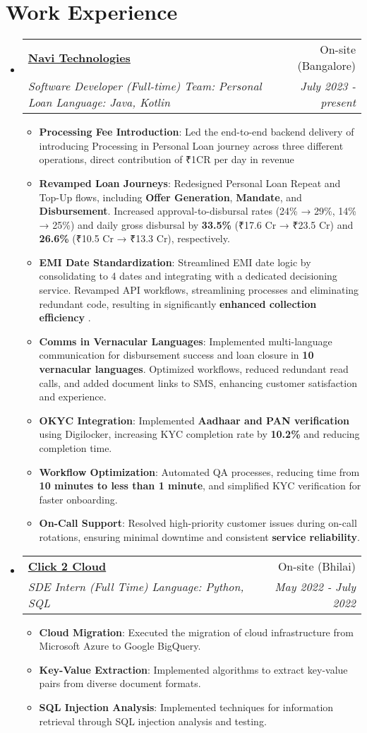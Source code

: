 \documentclass[a4paper,20pt]{article}
\makeatletter
\newcommand{\resumeItem}[2]{
  \item\small{
    \textbf{#1}{: #2 \vspace{-2pt}}
  }
}
\newcommand{\resumeSubheading}[4]{
  \vspace{-1pt}\item
    \begin{tabular*}{0.97\textwidth}{l@{\extracolsep{\fill}}r}
      \textbf{#1} & #2 \\
      \textit{#3} & \textit{#4} \\
    \end{tabular*}\vspace{-5pt}
}
\newcommand{\resumeSubHeadingListStart}{\begin{itemize}[leftmargin=*]}
\newcommand{\resumeSubHeadingListEnd}{\end{itemize}}
\newcommand{\resumeItemListStart}{\begin{itemize}}
\newcommand{\resumeItemListEnd}{\end{itemize}\vspace{-5pt}}
\makeatother
\begin{document}
\section{Work Experience}
  \resumeSubHeadingListStart
    \resumeSubheading{\href{https://navi.com/}{Navi Technologies}}{On-site (Bangalore)}
    {Software Developer (Full-time) \textbar{} Team: Personal Loan \textbar{} Language: Java, Kotlin}
    {July 2023 - present}
    \resumeItemListStart
    \resumeItem {Processing Fee Introduction}{Led the end-to-end backend delivery of introducing Processing in Personal Loan journey across three different operations, direct contribution of ₹1CR per day in revenue}
    \resumeItem {Revamped Loan Journeys}{Redesigned Personal Loan Repeat and Top-Up flows, including \textbf{Offer Generation}, \textbf{Mandate}, and \textbf{Disbursement}. Increased approval-to-disbursal rates (24\% → 29\%, 14\% → 25\%) and daily gross disbursal by \textbf{33.5\%} (₹17.6 Cr → ₹23.5 Cr) and \textbf{26.6\%} (₹10.5 Cr → ₹13.3 Cr), respectively.}
    \resumeItem {EMI Date Standardization}{Streamlined EMI date logic by consolidating to 4 dates and integrating with a dedicated decisioning service. Revamped API workflows, streamlining processes and eliminating redundant code, resulting in significantly \textbf{enhanced collection efficiency}}.
    \resumeItem {Comms in Vernacular Languages}{Implemented multi-language communication for disbursement success and loan closure in \textbf{10 vernacular languages}. Optimized workflows, reduced redundant read calls, and added document links to SMS, enhancing customer satisfaction and experience.}
    \resumeItem {OKYC Integration}{Implemented \textbf{Aadhaar and PAN verification} using Digilocker, increasing KYC completion rate by \textbf{10.2\%} and reducing completion time.}
    \resumeItem {Workflow Optimization}{Automated QA processes, reducing time from \textbf{10 minutes to less than 1 minute}, and simplified KYC verification for faster onboarding.}
    \resumeItem {On-Call Support}{Resolved high-priority customer issues during on-call rotations, ensuring minimal downtime and consistent \textbf{service reliability}.}
\resumeItemListEnd

\vspace{2pt}
    \resumeSubheading
		{\href{https://www.click2cloud.com/}{Click 2 Cloud}}{On-site (Bhilai)}
		{SDE Intern (Full Time) \textbar{} Language: Python, SQL}{May 2022 - July 2022}
		\resumeItemListStart
        \resumeItem {Cloud Migration}{Executed the migration of cloud infrastructure from Microsoft Azure to Google BigQuery.}
        \resumeItem {Key-Value Extraction}{Implemented algorithms to extract key-value pairs from diverse document formats.}
        \resumeItem {SQL Injection Analysis}{Implemented techniques for information retrieval through SQL injection analysis and testing.}
		\resumeItemListEnd
\vspace{-5pt}
\resumeSubHeadingListEnd
\end{document}
